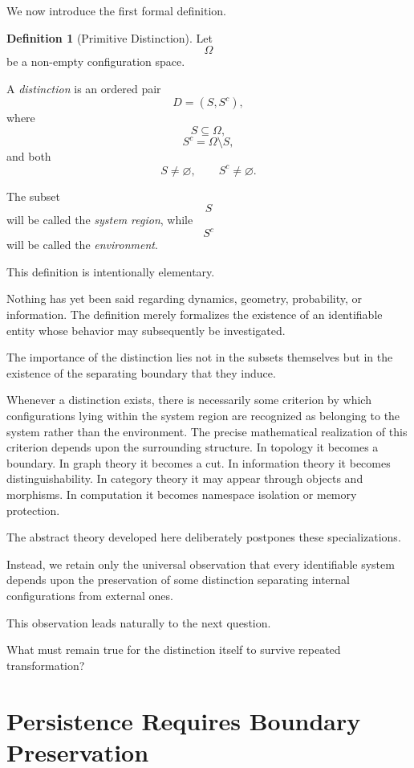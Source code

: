 \documentclass[11pt]{book}
\numberwithin{equation}{chapter}
\theoremstyle{definition}
\newtheorem{definition}{Definition}[chapter]
\theoremstyle{plain}
\begin{document}
We now introduce the first formal definition.

\begin{definition}[Primitive Distinction]
Let
\[
\Omega
\]
be a non-empty configuration space.

A \emph{distinction} is an ordered pair
\[
D=(S,S^{c}),
\]
where
\[
S\subseteq\Omega,
\]
\[
S^{c}=\Omega\setminus S,
\]
and both
\[
S\neq\varnothing,
\qquad
S^{c}\neq\varnothing.
\]

The subset
\[
S
\]
will be called the \emph{system region}, while
\[
S^{c}
\]
will be called the \emph{environment}.
\end{definition}

This definition is intentionally elementary.

Nothing has yet been said regarding dynamics, geometry, probability, or information. The definition merely formalizes the existence of an identifiable entity whose behavior may subsequently be investigated.

The importance of the distinction lies not in the subsets themselves but in the existence of the separating boundary that they induce.

Whenever a distinction exists, there is necessarily some criterion by which configurations lying within the system region are recognized as belonging to the system rather than the environment. The precise mathematical realization of this criterion depends upon the surrounding structure. In topology it becomes a boundary. In graph theory it becomes a cut. In information theory it becomes distinguishability. In category theory it may appear through objects and morphisms. In computation it becomes namespace isolation or memory protection.

The abstract theory developed here deliberately postpones these specializations.

Instead, we retain only the universal observation that every identifiable system depends upon the preservation of some distinction separating internal configurations from external ones.

This observation leads naturally to the next question.

What must remain true for the distinction itself to survive repeated transformation?

\section{Persistence Requires Boundary Preservation}
\end{document}
